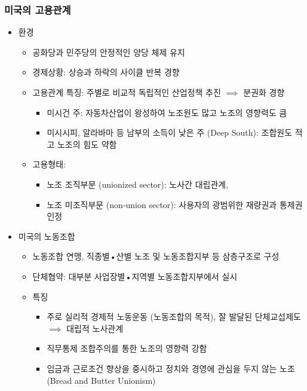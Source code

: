 \documentclass[aspectratio=169,xcolor=dvipsnames,handout]{beamer}
\begin{document}
\begin{frame}[allowframebreaks]
    \frametitle{미국의 고용관계}
    \begin{itemize}[<+->]
        \item 환경
        \begin{itemize}
            \item 공화당과 민주당의 안정적인 양당 체제 유지
            \item 경제상황: 상승과 하락의 사이클 반복 경향
            \item 고용관계 특징: 주별로 비교적 독립적인 산업정책 추진 $\implies$ 분권화 경향
            \begin{itemize}
                \item 미시건 주: 자동차산업이 왕성하여 노조원도 많고 노조의 영향력도 큼
                \item 미시시피, 알라바마 등 남부의 소득이 낮은 주 (Deep South): 조합원도 적고 노조의 힘도 약함
            \end{itemize}
            \item 고용형태:
            \begin{itemize}
                \item 노조 조직부문 (unionized sector): 노사간 대립관계, 
                \item 노조 미조직부문 (non-union sector): 사용자의 광범위한 재량권과 통제권 인정
            \end{itemize}
        \end{itemize}
    \framebreak%
        \item 미국의 노동조합
        \begin{itemize}
            \item 노동조합 연맹, 직종별•산별 노조 및 노동조합지부 등 삼층구조로 구성 
            \item 단체협약: 대부분 사업장별•지역별 노동조합지부에서 실시
            \item 특징
            \begin{itemize}
                \item 주로 실리적 경제적 노동운동 (노동조합의 목적), 잘 발달된 단체교섭제도 $\implies$ 대립적 노사관계
                \item 직무통제 조합주의를 통한 노조의 영향력 강함
                \item 임금과 근로조건 향상을 중시하고 정치와 경영에 관심을 두지 않는 노조 (Bread and Butter Unionism)
            \end{itemize}
        \end{itemize}

\end{itemize}
\end{frame}
\end{document}
